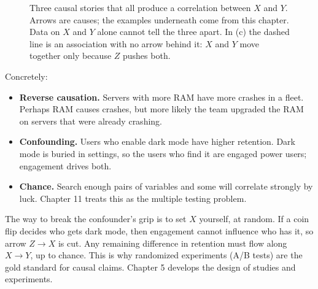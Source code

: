 \begin{figure}[H]
\centering
{}
\caption{Three causal stories that all produce a correlation between $X$ and $Y$.
Arrows are causes; the examples underneath come from this chapter. Data on $X$
and $Y$ alone cannot tell the three apart. In (c) the dashed line is an
association with no arrow behind it: $X$ and $Y$ move together only because $Z$
pushes both.}
\label{fig:two-variables-dags}
\end{figure}

Concretely:
\begin{itemize}
  \item \textbf{Reverse causation.} Servers with more RAM have more crashes in a
    fleet. Perhaps RAM causes crashes, but more likely the team upgraded the RAM
    on servers that were already crashing.
  \item \textbf{Confounding.} Users who enable dark mode have higher retention. Dark
    mode is buried in settings, so the users who find it are engaged power users;
    engagement drives both.
  \item \textbf{Chance.} Search enough pairs of variables and some will correlate
    strongly by luck. Chapter 11 treats this as the multiple testing problem.
\end{itemize}

\begin{intuitionbox}
The way to break the confounder's grip is to set $X$ yourself, at random. If a coin
flip decides who gets dark mode, then engagement cannot influence who has it, so
arrow $Z \to X$ is cut. Any remaining difference in retention must flow along
$X \to Y$, up to chance. This is why randomized experiments (A/B tests) are the
gold standard for causal claims. Chapter 5 develops the design of studies and
experiments.
\end{intuitionbox}

